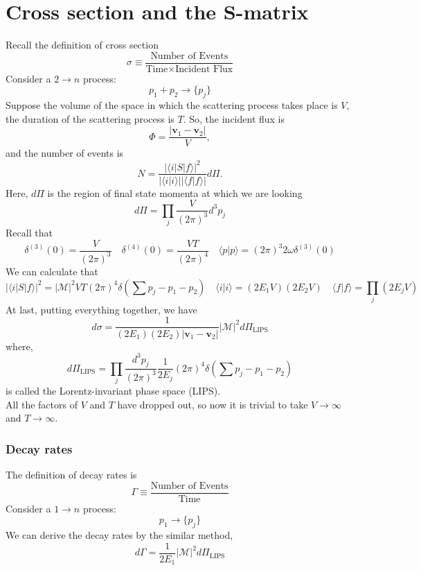 \section{Cross section and the S-matrix}
\noindent
Recall the definition of cross section
\[\sigma \equiv \frac{\mbox{Number of Events}}{\mbox{Time} \times \mbox{Incident Flux}}\]
Consider a  $2 \to n$ process:
\[p_1 + p_2 \to \{p_j\}\]
Suppose the volume of the space in which the scattering process takes place is $V$, the duration of the scattering process is $T$. 
So, the incident flux is
\[\Phi = \frac{|\bm{v}_1-\bm{v}_2|}{V},\]
and the number of events is
\[N = \frac{|\langle i | S | f \rangle|^2}{|\langle i | i \rangle||\langle f | f \rangle|} d\Pi .\]
Here, $d\Pi$ is the region of final state momenta at which we are looking
\[d\Pi = \prod_j \frac{V}{(2\pi)^3} d^3 p_j\]
Recall that
\[\delta^{(3)}(0) = \frac{V}{(2\pi)^3} \quad \delta^{(4)}(0) = \frac{VT}{(2\pi)^4} \quad \langle p | p \rangle = (2\pi)^3 2\omega \delta^{(3)}(0)\]
We can calculate that
\[|\langle i | S | f \rangle|^2 = |\mathcal{M}|^2 VT (2\pi)^4 \delta(\sum p_j - p_1 - p_2) \quad \langle i | i \rangle = (2E_1V) (2E_2V) \quad \langle f | f \rangle = \prod_j (2E_jV)\]
At last, putting everything together, we have
\[d\sigma = \frac{1}{(2E_1)(2E_2)|\bm{v}_1-\bm{v}_2|} |\mathcal{M}|^2 d\Pi_{\mathrm{LIPS}}\]
where,
\[d\Pi_{\mathrm{LIPS}} = \prod_j \frac{d^3p_j}{(2\pi)^3} \frac{1}{2E_j} (2\pi)^4 \delta(\sum p_j - p_1 - p_2)\]
is called the Lorentz-invariant phase space (LIPS). \\
All the factors of $V$ and $T$ have dropped out, so now it is trivial to take $V \to \infty$ and $T \to \infty$. 

\subsubsection{Decay rates}
\noindent
The definition of decay rates is
\[\Gamma \equiv \frac{\mbox{Number of Events}}{\mbox{Time}}\]
Consider a  $1 \to n$ process:
\[p_1 \to \{p_j\}\]
We can derive the decay rates by the similar method,
\[d\Gamma = \frac{1}{2E_1} |\mathcal{M}|^2 d\Pi_{\mathrm{LIPS}} \]
